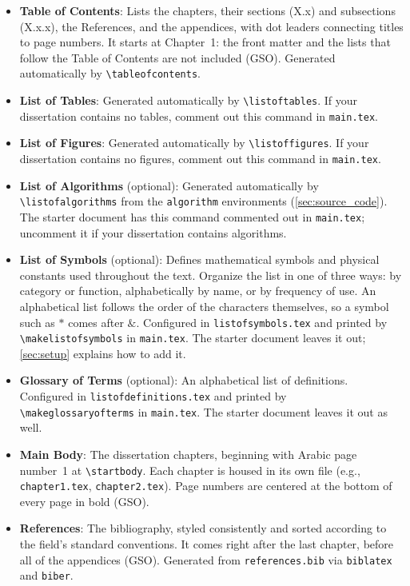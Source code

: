 \begin{itemize}
\item \textbf{Table of Contents}: Lists the chapters, their sections (X.x) and subsections (X.x.x), the References, and the appendices, with dot leaders connecting titles to page numbers. It starts at Chapter~1: the front matter and the lists that follow the Table of Contents are not included (GSO). Generated automatically by \verb+\tableofcontents+.

\item \textbf{List of Tables}: Generated automatically by \verb+\listoftables+. If your dissertation contains no tables, comment out this command in \texttt{main.tex}.

\item \textbf{List of Figures}: Generated automatically by \verb+\listoffigures+. If your dissertation contains no figures, comment out this command in \texttt{main.tex}.

\item \textbf{List of Algorithms} (optional): Generated automatically by \verb+\listofalgorithms+ from the \texttt{algorithm} environments (\cref{sec:source_code}). The starter document has this command commented out in \texttt{main.tex}; uncomment it if your dissertation contains algorithms.

\item \textbf{List of Symbols} (optional): Defines mathematical symbols and physical constants used throughout the text. Organize the list in one of three ways: by category or function, alphabetically by name, or by frequency of use. An alphabetical list follows the order of the characters themselves, so a symbol such as $*$ comes after $\&$. Configured in \texttt{listofsymbols.tex} and printed by \verb+\makelistofsymbols+ in \texttt{main.tex}. The starter document leaves it out; \cref{sec:setup} explains how to add it.

\item \textbf{Glossary of Terms} (optional): An alphabetical list of definitions. Configured in \texttt{listofdefinitions.tex} and printed by \verb+\makeglossaryofterms+ in \texttt{main.tex}. The starter document leaves it out as well.


\item \textbf{Main Body}: The dissertation chapters, beginning with Arabic page number~1 at \verb+\startbody+. Each chapter is housed in its own file (e.g., \texttt{chapter1.tex}, \texttt{chapter2.tex}). Page numbers are centered at the bottom of every page in bold (GSO).

\item \textbf{References}: The bibliography, styled consistently and sorted according to the field's standard conventions. It comes right after the last chapter, before all of the appendices (GSO). Generated from \texttt{references.bib} via \texttt{biblatex} and \texttt{biber}.


\end{itemize}
